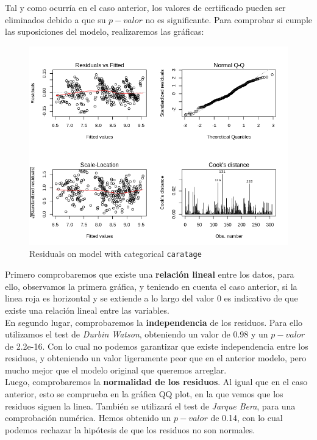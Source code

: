 \documentclass[a4paper, 9pt]{article}
\begin{document}
Tal y como ocurría en el caso anterior, los valores de certificado pueden ser eliminados debido a que su $p-valor$ no es significante. Para comprobar si cumple las suposiciones del modelo, realizaremos las gráficas:

\begin{figure}[h!]
    \centering
    \includegraphics[scale=0.5]{report/images/question-3/residuals-squared.png}
    \caption{Residuals on model with categorical \texttt{caratage}}
    \label{fig:my_label}
\end{figure}

Primero comprobaremos que existe una \textbf{relación lineal} entre los datos, para ello, observamos la primera gráfica, y teniendo en cuenta el caso anterior, si la linea roja es horizontal y se extiende a lo largo del valor 0 es indicativo de que existe una relación lineal entre las variables. \\

En segundo lugar, comprobaremos la \textbf{independencia} de los residuos. Para ello utilizamos el test de \textit{Durbin Watson}, obteniendo un valor de 0.98 y un $p-valor$ de 2.2e-16. Con lo cual no podemos garantizar que existe independencia entre los residuos, y obteniendo un valor ligeramente peor que en el anterior modelo, pero mucho mejor que el modelo original que queremos arreglar.\\

Luego, comprobaremos la \textbf{normalidad de los residuos}. Al igual que en el caso anterior, esto se comprueba en la gráfica QQ plot, en la que vemos que los residuos siguen la linea. También se utilizará el test de \textit{Jarque Bera}, para una comprobación numérica. Hemos obtenido un $p-valor$ de 0.14, con lo cual podemos rechazar la hipótesis de que los residuos no son normales.\\
\end{document}
